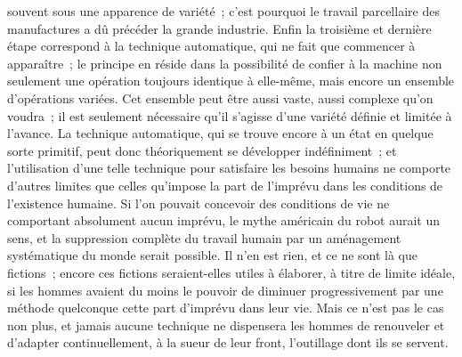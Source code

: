 \documentclass[french,twoside]{book} %
\begin{document}
souvent sous une apparence de variété ; c'est pourquoi le travail parcellaire des manufactures a dû précéder la grande industrie. Enfin la troisième et dernière étape correspond à la technique automatique, qui ne fait que commencer à apparaître ; le principe en réside dans la possibilité de confier à la machine non seulement une opération toujours identique à elle-même, mais encore un ensemble d'opérations variées. Cet ensemble peut être aussi vaste, aussi complexe qu'on voudra ; il est seulement nécessaire qu'il s'agisse d'une variété définie et limitée à l'avance. La technique automatique, qui se trouve encore à un état en quelque sorte primitif, peut donc théoriquement se développer indéfiniment ; et l'utilisation d'une telle technique pour satisfaire les besoins humains ne comporte d'autres limites que celles qu'impose la part de l'imprévu dans les conditions de l'existence humaine. Si l'on pouvait concevoir des conditions de vie ne comportant absolument aucun imprévu, le mythe américain du robot aurait un sens, et la suppression complète du travail humain par un aménagement systématique du monde serait possible. Il n'en est rien, et ce ne sont là que fictions ; encore ces fictions seraient-elles utiles à élaborer, à titre de limite idéale, si les hommes avaient du moins le pouvoir de diminuer progressivement par une méthode quelconque cette part d'imprévu dans leur vie. Mais ce n'est pas le cas non plus, et jamais aucune technique ne dispensera les hommes de renouveler et d'adapter continuellement, à la sueur de leur front, l'outillage dont ils se servent.\par
\end{document}
